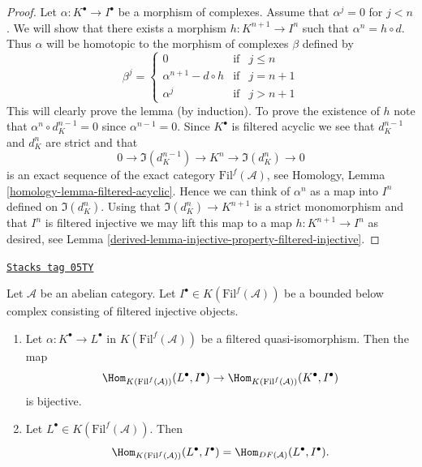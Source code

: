 \begin{proof}

Let $\alpha : K^\bullet \to I^\bullet$ be a morphism of
complexes. Assume that $\alpha^j = 0$ for $j < n$.
We will show that there exists a morphism $h : K^{n + 1} \to I^n$
such that $\alpha^n = h \circ d$. Thus $\alpha$ will be homotopic
to the morphism of complexes $\beta$ defined by
$$
\beta^j =
\left\{
\begin{matrix}
0 & \text{if} & j \leq n \\
\alpha^{n + 1} - d \circ h & \text{if} & j = n + 1 \\
\alpha^j & \text{if} & j > n + 1
\end{matrix}
\right.
$$
This will clearly prove the lemma (by induction).
To prove the existence of $h$ note that
$\alpha^n \circ d_K^{n - 1} = 0$ since
$\alpha^{n - 1} = 0$. Since $K^\bullet$ is filtered acyclic
we see that $d_K^{n - 1}$ and $d_K^n$ are strict and that
$$
0 \to \Im(d_K^{n - 1}) \to K^n \to \Im(d_K^n) \to 0
$$
is an exact sequence of the exact category $\text{Fil}^f(\mathcal{A})$, see
Homology, Lemma \ref{homology-lemma-filtered-acyclic}.
Hence we can think of $\alpha^n$ as a map into $I^n$ defined
on $\Im(d_K^n)$.
Using that $\Im(d_K^n) \to K^{n + 1}$ is a strict monomorphism
and that $I^n$ is filtered injective we may lift this map to a map
$h : K^{n + 1} \to I^n$ as desired, see
Lemma \ref{derived-lemma-injective-property-filtered-injective}.
\end{proof}

\begin{lemma}
\label{derived-lemma-morphisms-into-filtered-injective-complex}
\href{https://stacks.math.columbia.edu/tag/05TY}{\texttt{Stacks tag 05TY}}

Let $\mathcal{A}$ be an abelian category.
Let $I^\bullet \in K(\text{Fil}^f(\mathcal{A}))$
be a bounded below complex consisting of
filtered injective objects.
\begin{enumerate}
\item Let $\alpha : K^\bullet \to L^\bullet$ in $K(\text{Fil}^f(\mathcal{A}))$
be a filtered quasi-isomorphism.
Then the map
$$
\Hom_{K(\text{Fil}^f(\mathcal{A}))}(L^\bullet, I^\bullet)
\to
\Hom_{K(\text{Fil}^f(\mathcal{A}))}(K^\bullet, I^\bullet)
$$
is bijective.
\item Let $L^\bullet \in K(\text{Fil}^f(\mathcal{A}))$. Then
$$
\Hom_{K(\text{Fil}^f(\mathcal{A}))}(L^\bullet, I^\bullet)
=
\Hom_{DF(\mathcal{A})}(L^\bullet, I^\bullet).
$$
\end{enumerate}
\end{lemma}

